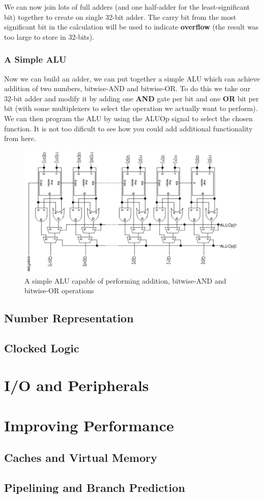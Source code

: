 \documentclass{article}
\begin{document}
	We can now join lots of full adders (and one half-adder for the least-significant bit) together to create on single 32-bit adder. The carry bit from the most significant bit in the calculation will be used to indicate \textbf{overflow} (the result was too large to store in 32-bits).
	
	\subsubsection{A Simple ALU}
	Now we can build an adder, we can put together a simple ALU which can achieve addition of two numbers, bitwise-AND and bitwise-OR. To do this we take our 32-bit adder and modify it by adding one \textbf{AND} gate per bit and one \textbf{OR} bit per bit (with some multiplexers to select the operation we actually want to perform). We can then program the ALU by using the ALUOp signal to select the chosen function. It is not too dificult to see how you could add additional functionality from here.
	
	\begin{figure}[ht]
		\centering
		\includegraphics[width=1\textwidth]{simple_ALU}
		\caption{A simple ALU capable of performing addition, bitwise-AND and bitwise-OR operations}
		\label{fig:simple ALU}
	\end{figure}	
	
	\subsection{Number Representation}
	\subsection{Clocked Logic}
	
	\section{I/O and Peripherals}
	
	\section{Improving Performance}
	\subsection{Caches and Virtual Memory}
	\subsection{Pipelining and Branch Prediction}
	
	\newpage
	\listoffigures
	\printindex	
\end{document}
